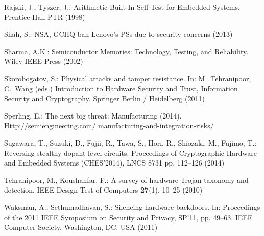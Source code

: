 \documentclass[a4paper]{llncs}
\begin{document}
\begin{thebibliography}{10}
Rajski, J., Tyszer, J.: Arithmetic Built-In Self-Test for Embedded Systems.
\newblock Prentice Hall PTR (1998)

Shah, S.: {NSA}, {GCHQ} ban {L}enovo's {PS}s due to security concerns (2013)

Sharma, A.K.: Semiconductor Memories: Technology, Testing, and Reliability.
\newblock Wiley-IEEE Press (2002)

Skorobogatov, S.: Physical attacks and tamper resistance.
\newblock In: M.~Tehranipoor, C.~Wang (eds.) Introduction to Hardware Security
  and Trust, Information Security and Cryptography. Springer Berlin /
  Heidelberg (2011)

Sperling, E.: The next big threat: Manufacturing (2014).
\newblock Http://semiengineering.com/ manufacturing-and-integration-risks/

Sugawara, T., Suzuki, D., Fujii, R., Tawa, S., Hori, R., Shiozaki, M., Fujimo,
  T.: Reversing stealthy dopant-level circuits.
\newblock Proceedings of Cryptographic Hardware and Embedded Systems
  (CHES'2014), LNCS 8731 pp. 112--126 (2014)

Tehranipoor, M., Koushanfar, F.: A survey of hardware {T}rojan taxonomy and
  detection.
\newblock IEEE Design Test of Computers \textbf{27}(1), 10--25 (2010)

Waksman, A., Sethumadhavan, S.: Silencing hardware backdoors.
\newblock In: Proceedings of the 2011 IEEE Symposium on Security and Privacy,
  SP'11, pp. 49--63. IEEE Computer Society, Washington, DC, USA (2011)

\end{thebibliography}


 
\end{document}
